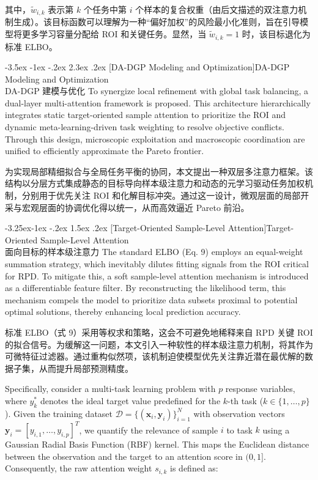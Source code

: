 \documentclass[11pt]{article}
\makeatletter
\renewcommand\section{\@startsection {section}{1}{\z@}%
                                       {-3.5ex \@plus -1ex \@minus -.2ex}%
                                       {2.3ex \@plus.2ex}%
                                       {\normalfont\fontfamily{phv}\fontsize{16}{19}\bfseries}}
\renewcommand\subsection{\@startsection{subsection}{2}{\z@}%
                                         {-3.25ex\@plus -1ex \@minus -.2ex}%
                                         {1.5ex \@plus .2ex}%
                                         {\normalfont\fontfamily{phv}\fontsize{14}{17}\bfseries}}
\newcommand{\bisection}[2]{\section[#1]{#1\protect\\#2}}
\newcommand{\bisubsection}[2]{\subsection[#1]{#1\protect\\#2}}
\makeatother
\begin{document}
其中，$\tilde{w}_{i,k}$ 表示第 $k$ 个任务中第 $i$ 个样本的复合权重（由后文描述的双注意力机制生成）。该目标函数可以理解为一种“偏好加权”的风险最小化准则，旨在引导模型将更多学习容量分配给 ROI 和关键任务。显然，当 $\tilde{w}_{i,k}=1$ 时，该目标退化为标准 ELBO。


\bisection{DA-DGP Modeling and Optimization}{DA-DGP 建模与优化} \label{s:sec3}
To synergize local refinement with global task balancing, a dual-layer multi-attention framework is proposed. This architecture hierarchically integrates static target-oriented sample attention to prioritize the ROI and dynamic meta-learning-driven task weighting to resolve objective conflicts. Through this design, microscopic exploitation and macroscopic coordination are unified to efficiently approximate the Pareto frontier.

为实现局部精细拟合与全局任务平衡的协同，本文提出一种双层多注意力框架。该结构以分层方式集成静态的目标导向样本级注意力和动态的元学习驱动任务加权机制，分别用于优先关注 ROI 和化解目标冲突。通过这一设计，微观层面的局部开采与宏观层面的协调优化得以统一，从而高效逼近 Pareto 前沿。

\bisubsection{Target-Oriented Sample-Level Attention}{面向目标的样本级注意力} \label{s:sec3.1}
The standard ELBO (Eq. 9) employs an equal-weight summation strategy, which inevitably dilutes fitting signals from the ROI critical for RPD. To mitigate this, a soft sample-level attention mechanism is introduced as a differentiable feature filter. By reconstructing the likelihood term, this mechanism compels the model to prioritize data subsets proximal to potential optimal solutions, thereby enhancing local prediction accuracy.

标准 ELBO（式 9）采用等权求和策略，这会不可避免地稀释来自 RPD 关键 ROI 的拟合信号。为缓解这一问题，本文引入一种软性的样本级注意力机制，将其作为可微特征过滤器。通过重构似然项，该机制迫使模型优先关注靠近潜在最优解的数据子集，从而提升局部预测精度。

Specifically, consider a multi-task learning problem with $p$ response variables, where $y_{k}^{*}$ denotes the ideal target value predefined for the $k$-th task ($k \in \{1, \ldots, p\}$). Given the training dataset $\mathcal{D}=\{(\mathbf{x}_{i}, \mathbf{y}_{i})\}_{i=1}^{N}$ with observation vectors $\mathbf{y}_{i}=[y_{i,1}, \ldots, y_{i,p}]^{T}$, we quantify the relevance of sample $i$ to task $k$ using a Gaussian Radial Basis Function (RBF) kernel. This maps the Euclidean distance between the observation and the target to an attention score in $(0, 1]$. Consequently, the raw attention weight $s_{i,k}$ is defined as:
\end{document}

